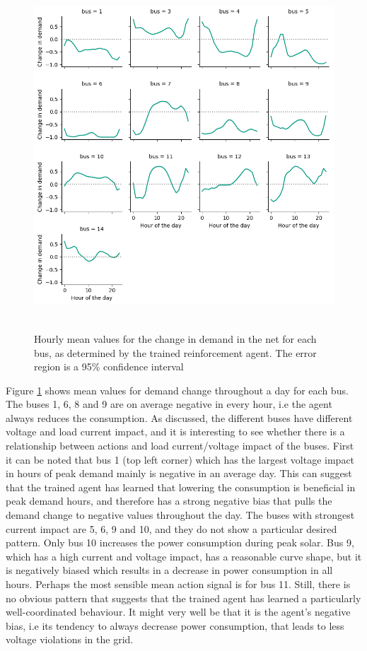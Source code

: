 \documentclass[class=book, crop=false, 11pt]{standalone}
\begin{document}
\begin{figure}[h]
    \center
\includegraphics[height=13cm, width=12cm]{figures/config1_action_bus.png}
    \caption {Hourly mean values for the change in demand in the net for each bus, as determined by the trained reinforcement agent. The error region is a 95\% confidence interval}
    \label{fig:discussion:config1_action_bus}
\end{figure}

Figure \ref{fig:discussion:config1_action_bus} shows mean values for demand change throughout a day for each bus.  The buses 1, 6, 8 and 9 are on average negative in every hour, i.e the agent always reduces the consumption. As discussed, the different buses have different voltage and load current impact, and it is interesting to see whether there is a relationship between actions and load current/voltage impact of the buses. First it can be noted that bus 1 (top left corner) which has the largest voltage impact in hours of peak demand mainly is negative in an average day. This can suggest that the trained agent has learned that lowering the consumption is beneficial in peak demand hours, and therefore has a strong negative bias that pulls the demand change to negative values throughout the day. The buses with strongest current impact are 5, 6, 9 and 10, and they do not show a particular desired pattern. Only bus 10 increases the power consumption during peak solar. Bus 9, which has a high current and voltage impact, has a reasonable curve shape, but it is negatively biased which results in a decrease in power consumption in all hours. Perhaps the most sensible mean action signal is for bus 11. Still, there is no obvious pattern that suggests that the trained agent has learned a particularly well-coordinated behaviour. It might very well be that it is the agent's negative bias, i.e its tendency to always decrease power consumption, that leads to less voltage violations in the grid.
\end{document}
